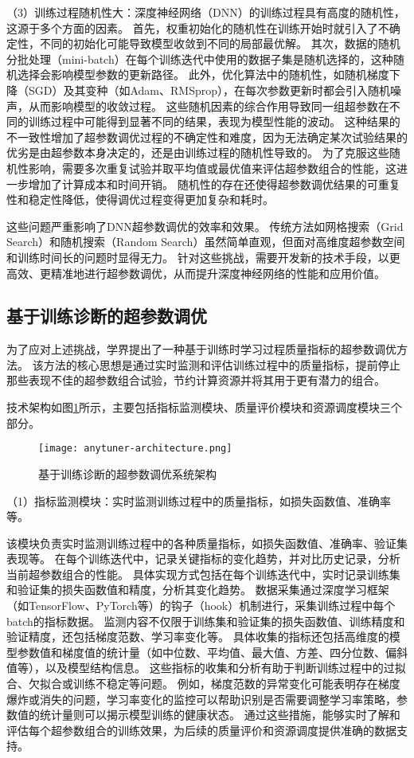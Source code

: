 （3）训练过程随机性大：深度神经网络（DNN）的训练过程具有高度的随机性，这源于多个方面的因素。
首先，权重初始化的随机性在训练开始时就引入了不确定性，不同的初始化可能导致模型收敛到不同的局部最优解。
其次，数据的随机分批处理（mini-batch）在每个训练迭代中使用的数据子集是随机选择的，这种随机选择会影响模型参数的更新路径。
此外，优化算法中的随机性，如随机梯度下降（SGD）及其变种（如Adam、RMSprop），在每次参数更新时都会引入随机噪声，从而影响模型的收敛过程。
这些随机因素的综合作用导致同一组超参数在不同的训练过程中可能得到显著不同的结果，表现为模型性能的波动。
这种结果的不一致性增加了超参数调优过程的不确定性和难度，因为无法确定某次试验结果的优劣是由超参数本身决定的，还是由训练过程的随机性导致的。
为了克服这些随机性影响，需要多次重复试验并取平均值或最优值来评估超参数组合的性能，这进一步增加了计算成本和时间开销。
随机性的存在还使得超参数调优结果的可重复性和稳定性降低，使得调优过程变得更加复杂和耗时。

这些问题严重影响了DNN超参数调优的效率和效果。
传统方法如网格搜索（Grid Search）和随机搜索（Random Search）虽然简单直观，但面对高维度超参数空间和训练时间长的问题时显得无力。
针对这些挑战，需要开发新的技术手段，以更高效、更精准地进行超参数调优，从而提升深度神经网络的性能和应用价值。

\subsection{基于训练诊断的超参数调优}

为了应对上述挑战，学界提出了一种基于训练时学习过程质量指标的超参数调优方法\cite{Pei24}。
该方法的核心思想是通过实时监测和评估训练过程中的质量指标，提前停止那些表现不佳的超参数组合试验，节约计算资源并将其用于更有潜力的组合。

技术架构如图\ref{fig:anytunerarch}所示，主要包括指标监测模块、质量评价模块和资源调度模块三个部分。

\begin{figure}
  \centering
  \texttt{[image: anytuner-architecture.png]}
  \caption{基于训练诊断的超参数调优系统架构}
  \label{fig:anytunerarch}
\end{figure}

（1）指标监测模块：实时监测训练过程中的质量指标，如损失函数值、准确率等。

该模块负责实时监测训练过程中的各种质量指标，如损失函数值、准确率、验证集表现等。
在每个训练迭代中，记录关键指标的变化趋势，并对比历史记录，分析当前超参数组合的性能。
具体实现方式包括在每个训练迭代中，实时记录训练集和验证集的损失函数值和精度，分析其变化趋势。
数据采集通过深度学习框架（如TensorFlow、PyTorch等）的钩子（hook）机制进行，采集训练过程中每个batch的指标数据。
监测内容不仅限于训练集和验证集的损失函数值、训练精度和验证精度，还包括梯度范数、学习率变化等。
具体收集的指标还包括高维度的模型参数值和梯度值的统计量（如中位数、平均值、最大值、方差、四分位数、偏斜值等），以及模型结构信息。
这些指标的收集和分析有助于判断训练过程中的过拟合、欠拟合或训练不稳定等问题。
例如，梯度范数的异常变化可能表明存在梯度爆炸或消失的问题，学习率变化的监控可以帮助识别是否需要调整学习率策略，参数值的统计量则可以揭示模型训练的健康状态。
通过这些措施，能够实时了解和评估每个超参数组合的训练效果，为后续的质量评价和资源调度提供准确的数据支持。

